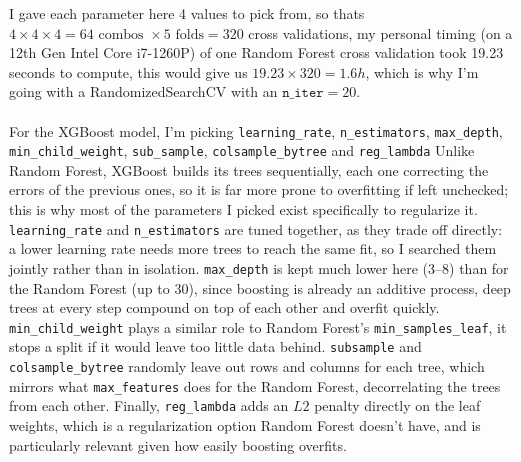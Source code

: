 \documentclass[14pt]{article}
\begin{document}
	I gave each parameter here 4 values to pick from, so thats $4\times4\times4 = 64\text{ combos } \times 5\text{ folds} = 320$ cross validations, my personal timing (on a 12th Gen Intel Core i7-1260P) of one Random Forest cross validation took 19.23 seconds to compute,
	this would give us $19.23 \times 320 = 1.6h$, which is why I'm going with a RandomizedSearchCV with an $\texttt{n\_iter} = 20$.
	\\\\
	For the XGBoost model, I'm picking \texttt{learning\_rate}, \texttt{n\_estimators}, \texttt{max\_depth}, \texttt{min\_child\_weight}, \texttt{sub\_sample}, \texttt{colsample\_bytree} and \texttt{reg\_lambda}
	Unlike Random Forest, XGBoost builds its trees sequentially, each one correcting the errors of the previous ones, so it is far more prone to overfitting if left unchecked; this is why most of the parameters I picked exist specifically to regularize it.
	\texttt{learning\_rate} and \texttt{n\_estimators} are tuned together, as they trade off directly: a lower learning rate needs more trees to reach the same fit, so I searched them jointly rather than in isolation.
	\texttt{max\_depth} is kept much lower here (3--8) than for the Random Forest (up to 30), since boosting is already an additive process, deep trees at every step compound on top of each other and overfit quickly.
	\texttt{min\_child\_weight} plays a similar role to Random Forest's \texttt{min\_samples\_leaf}, it stops a split if it would leave too little data behind. \texttt{subsample} and \texttt{colsample\_bytree} randomly leave out rows and columns for each tree, which mirrors what \texttt{max\_features} does for the Random Forest, decorrelating the trees from each other.
	Finally, \texttt{reg\_lambda} adds an $L2$ penalty directly on the leaf weights, which is a regularization option Random Forest doesn't have, and is particularly relevant given how easily boosting overfits.
\end{document}
